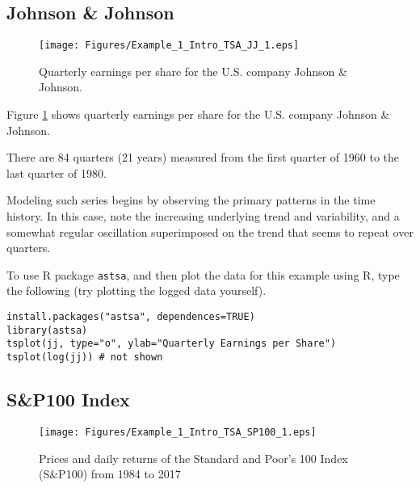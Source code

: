 \documentclass[
paper=128mm:96mm, %
fontsize=9.5pt, %
pagesize, %
parskip=half-, %
]{scrartcl} %
\theoremstyle{mythmstyle} %
\begin{document}
\subsection{Johnson \& Johnson}
\begin{figure}[!h]
\begin{center}
%
\texttt{[image: Figures/Example\_1\_Intro\_TSA\_JJ\_1.eps]}
%
\caption{\footnotesize{Quarterly earnings per share for the U.S. company Johnson \& Johnson. }}
%
\label{fig:johnsonjohnson}
%
\end{center}
\end{figure}
%
\clearpage

Figure \ref{fig:johnsonjohnson} shows quarterly earnings per share for the U.S. company Johnson \& Johnson. 

There are 84 quarters (21 years) measured from the first quarter of 1960 to the last quarter of 1980. 

Modeling such series begins by observing the primary patterns in the time history. In this case, note the increasing underlying trend and variability, and a somewhat regular oscillation superimposed on the trend that seems to repeat over quarters. 

To use R package \texttt{astsa}, and then plot the data for this example using R, type the following (try plotting the logged data yourself).

\begin{lstlisting}[belowskip=-0.8 \baselineskip]
install.packages("astsa", dependences=TRUE)
library(astsa) 
tsplot(jj, type="o", ylab="Quarterly Earnings per Share") 
tsplot(log(jj)) # not shown
\end{lstlisting}
\clearpage


%
\subsection{S\&P100 Index}
\begin{figure}[!h]
\begin{center}
%
\texttt{[image: Figures/Example\_1\_Intro\_TSA\_SP100\_1.eps]}
%
\caption{\footnotesize{Prices and daily returns of the Standard and Poor's 100 Index (S\&P100) from 1984 to 2017 }}
%
\label{fig:sp100}
%
\end{center}
\end{figure}
%
\clearpage
\end{document}
